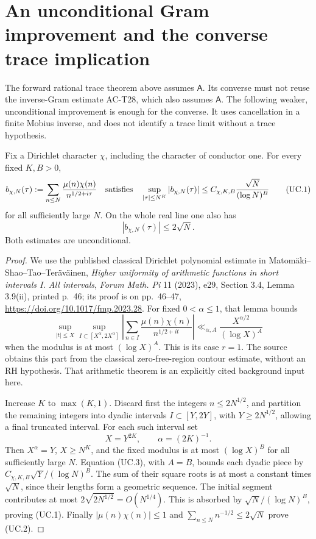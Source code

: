 \section{An unconditional Gram improvement and the converse trace implication}
\label{sec:trace-unconditional-converse}

The forward rational trace theorem above assumes \(\mathsf A\).
Its converse must not reuse the inverse-Gram estimate AC-T28,
which also assumes \(\mathsf A\).
The following weaker, unconditional improvement is enough for
the converse.  It uses cancellation in a finite Mobius inverse,
and does not identify a trace limit without a trace hypothesis.

\begin{lemma}
\label{AC-T49}
Fix a Dirichlet character \(\chi\), including the character
of conductor one.  For every fixed \(K,B>0\),
\[
 b_{\chi,N}(\tau)
   :=\sum_{n\leq N}\frac{\mu(n)\chi(n)}{n^{1/2+i\tau}}
 \quad\hbox{satisfies}\quad
 \sup_{|\tau|\leq N^K}|b_{\chi,N}(\tau)|
       \leq C_{\chi,K,B}\frac{\sqrt N}{(\log N)^B}
 \tag{UC.1}
\]
for all sufficiently large \(N\).
On the whole real line one also has
\[
                         |b_{\chi,N}(\tau)|\leq2\sqrt N .
 \tag{UC.2}
\]
Both estimates are unconditional.
\end{lemma}
\begin{proof}
We use the published classical Dirichlet polynomial estimate
in Matom\"aki--Shao--Tao--Ter\"av\"ainen,
\emph{Higher uniformity of arithmetic functions in short
intervals I. All intervals}, \emph{Forum Math. Pi} 11
(2023), e29, Section 3.4, Lemma 3.9(ii), printed p.~46;
its proof is on pp.~46--47,
\url{https://doi.org/10.1017/fmp.2023.28}.
For fixed \(0<\alpha\leq1\), that lemma bounds
\[
 \sup_{|t|\leq X}\sup_{I\subset[X^\alpha,2X^\alpha]}
 \left|\sum_{n\in I}\frac{\mu(n)\chi(n)}{n^{1/2+it}}\right|
       \ll_{\alpha,A}\frac{X^{\alpha/2}}{(\log X)^A}
 \tag{UC.3}
\]
when the modulus is at most \((\log X)^A\).
This is its case \(r=1\).
The source obtains this part from the classical zero-free-region
contour estimate, without an RH hypothesis.  That arithmetic
theorem is an explicitly cited background input here.

Increase \(K\) to \(\max(K,1)\).
Discard first the integers \(n\leq2N^{1/2}\), and partition
the remaining integers into dyadic intervals
\(I\subset[Y,2Y]\), with \(Y\geq2N^{1/2}\), allowing
a final truncated interval.
For each such interval set
\[
                       X=Y^{2K},\qquad \alpha=(2K)^{-1}.
\]
Then \(X^\alpha=Y\), \(X\geq N^K\), and the fixed modulus
is at most \((\log X)^B\) for all sufficiently large \(N\).
Equation (UC.3), with \(A=B\), bounds each dyadic piece by
\(C_{\chi,K,B}\sqrt Y/(\log N)^B\).
The sum of their square roots is at most a constant times
\(\sqrt N\), since their lengths form a geometric sequence.
The initial segment contributes at most
\(2\sqrt{2N^{1/2}}=O(N^{1/4})\).
This is absorbed by \(\sqrt N/(\log N)^B\), proving (UC.1).
Finally \(|\mu(n)\chi(n)|\leq1\) and
\(\sum_{n\leq N}n^{-1/2}\leq2\sqrt N\) prove (UC.2).
\end{proof}

